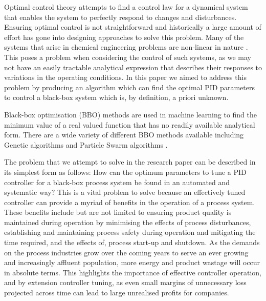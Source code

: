 \documentclass[conference]{IEEEtran}
\theoremstyle{definition}
\begin{document}
Optimal control theory attempts to find a control law for a dynamical system that enables the system to perfectly respond to changes and disturbances. Ensuring optimal control is not straightforward and historically a large amount of effort has gone into designing approaches to solve this problem. Many of the systems that arise in chemical engineering problems are non-linear in nature \cite{NonlinearSys}. This poses a problem when considering the control of such systems, as we may not have an easily tractable analytical expression that describes their responses to variations in the operating conditions. In this paper we aimed to address this problem by producing an algorithm which can find the optimal PID parameters to control a black-box system which is, by definition, a priori unknown. 

\noindent Black-box optimisation (BBO) methods are used in machine learning to find the minimum value of a real valued function that has no readily available analytical form. There are a wide variety of different BBO methods available including Genetic algorithms \cite{Genetic} and Particle Swarm algorithms \cite{Swarm}. 

The problem that we attempt to solve in the research paper can be described in its simplest form as follows: How can the optimum parameters to tune a PID controller for a black-box process system be found in an automated and systematic way? This is a vital problem to solve because an effectively tuned controller can provide a myriad of benefits in the operation of a process system. These benefits include but are not limited to ensuring product quality is maintained during operation by minimising the effects of process disturbances, establishing and maintaining process safety during operation and mitigating the time required, and the effects of, process start-up and shutdown. As the demands on the process industries grow over the coming years to serve an ever growing and increasingly affluent population, more energy and product wastage will occur in absolute terms. This highlights the importance of effective controller operation, and by extension controller tuning, as even small margins of unnecessary loss projected across time can lead to large unrealised profits for companies. 
\end{document}
